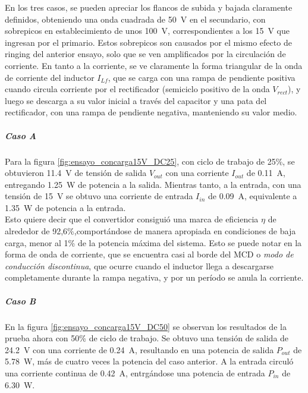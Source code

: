 En los tres casos, se pueden apreciar los flancos de subida y bajada claramente definidos, obteniendo una onda cuadrada de \SI[]{50}{\volt} en el secundario, con sobrepicos en establecimiento de unos \SI[]{100}{\volt}, correspondientes a los \SI[]{15}{\volt} que ingresan por el primario. Estos sobrepicos son causados por el mismo efecto de ringing del anterior ensayo, solo que se ven amplificados por la circulación de corriente. En tanto a la corriente, se ve claramente la forma triangular de la onda de corriente del inductor $I_{Lf}$, que se carga con una rampa de pendiente positiva cuando circula corriente por el rectificador (semiciclo positivo de la onda $V_{rect}$), y luego se descarga a su valor inicial a través del capacitor y una pata del rectificador, con una rampa de pendiente negativa, manteniendo su valor medio.\\

\subparagraph{Caso A}

Para la figura \ref{fig:ensayo_concarga15V_DC25}, con ciclo de trabajo de 25\%, se obtuvieron \SI[]{11.4}{\volt} de tensión de salida $V_{out}$ con una corriente $I_{out}$ de \SI[]{0.11}{\ampere}, entregando \SI[]{1.25}{\watt} de potencia a la salida. Mientras tanto, a la entrada, con una tensión de \SI[]{15}{\volt} se obtuvo una corriente de entrada $I_{in}$ de \SI[]{0.09}{\ampere}, equivalente a \SI[]{1.35}{\watt} de potencia a la entrada.\\

Esto quiere decir que el convertidor consiguió una marca de eficiencia $\eta$ de alrededor de 92,6\%,comportándose de manera apropiada en condiciones de baja carga, menor al 1\% de la potencia máxima del sistema. Esto se puede notar en la forma de onda de corriente, que se encuentra casi al borde del MCD o \textit{modo de conducción discontinua}, que ocurre cuando el inductor llega a descargarse completamente durante la rampa negativa, y por un período se anula la corriente.\\

\subparagraph{Caso B}

En la figura \ref{fig:ensayo_concarga15V_DC50} se observan los resultados de la prueba ahora con 50\% de ciclo de trabajo. Se obtuvo una tensión de salida de \SI[]{24.2}{\volt} con una corriente de \SI[]{0.24}{\ampere}, resultando en una potencia de salida $P_{out}$ de \SI[]{5.78}{\watt}, más de cuatro veces la potencia del caso anterior. A la entrada circuló una corriente continua de \SI[]{0.42}{\ampere}, entrgándose una potencia de entrada $P_{in}$ de \SI[]{6.30}{\watt}.\\

